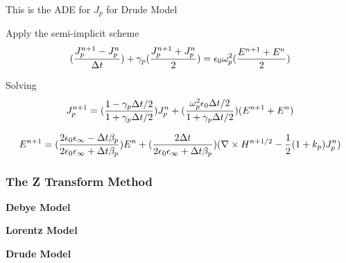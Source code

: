 This is the ADE for $J_p$ for Drude Model

Apply the semi-implicit scheme
\begin{displaymath}
  \Huge(\frac{J_p^{n+1} - J_p^n}{\Delta t}\Huge) + \gamma_{p}\Huge(\frac{J_p^{n+1} + J_p^n}{2}\Huge) = \epsilon_0\omega_p^2\Huge(\frac{E^{n+1} + E^n}{2}\Huge)
\end{displaymath}

Solving
\begin{displaymath}
  J_p^{n+1} = \Huge(\frac{1-\gamma_p\Delta t /2}{1+\gamma_p\Delta t /2}\Huge)J_p^n + \Huge(\frac{\omega_p^2\epsilon_0\Delta t /2}{1+\gamma_p\Delta t /2}\Huge)(E^{n+1}+E^n)
\end{displaymath}


\begin{displaymath}
  E^{n+1} = \Huge(\frac{2\epsilon_0\epsilon_{\infty} - \Delta t \beta_p}{2\epsilon_0\epsilon_{\infty} + \Delta t \beta_p}\Huge)E^n + \Huge(\frac{2\Delta t}{2\epsilon_0\epsilon_{\infty} + \Delta t \beta_p}\Huge)\Huge(\nabla\times H^{n+1/2} - \frac{1}{2}(1+k_p)J_p^n\Huge)
\end{displaymath}



\subsubsection{The Z Transform Method}
\textbf{Debye Model}

\textbf{Lorentz Model}

\textbf{Drude Model}
